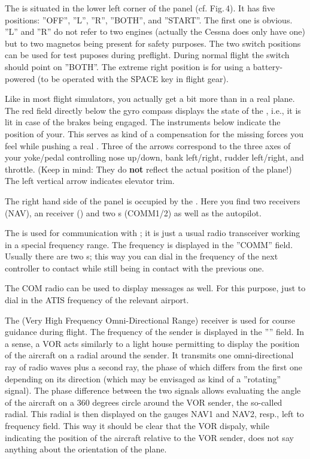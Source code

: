 The  is situated in the lower left corner of the panel (cf. Fig.\,4). It has five positions: ''OFF'', ''L'', ''R'', ''BOTH'', and ''START''. The first one is obvious. ''L'' and ''R'' do not refer to two engines (actually the Cessna does only have one) but to two magnetos being present for safety purposes. The two switch positions can be used for test puposes during preflight. During normal flight the switch should point on ''BOTH''. The extreme right position is for  using a battery-powered  (to be operated with the SPACE key in flight gear). 

Like in most flight simulators, you actually get a bit more than in a real plane. The red field directly below the gyro compass displays the state of the , i.e., it is lit in case of the brakes being engaged. The instruments below indicate the position of your. This serves as kind of a compensation for the missing forces you feel while pushing a real . Three of the arrows correspond to the three axes of your yoke/pedal controlling nose up/down, bank left/right, rudder left/right, and throttle. (Keep in mind: They do \textbf{not} reflect the actual position of the plane!) The left vertical arrow indicates elevator trim. 

The right hand side of the panel is occupied by the . Here you find
two  receivers (NAV), an  receiver
() and two s (COMM1/2) as
well as the autopilot.

The  is used for communication with ; it is just a usual radio transceiver working in a special frequency range.
The frequency is displayed in the ''COMM'' field. Usually there are two s; this way you can dial in the frequency of the next controller to contact
while still being in contact with the previous one.

The COM radio can be used to display  messages as well. For this purpose, just to dial in the ATIS frequency of the relevant airport.

The  (Very High Frequency Omni-Directional Range) receiver is used for course
guidance during flight. The frequency of the sender is displayed in the '''' field. In a sense, a VOR acts similarly to a light house permitting to display the position of the
aircraft on a radial around the sender. It transmits one omni-directional ray of radio
waves plus a second ray, the phase of which differs from the first one depending on its
direction (which may be envisaged as kind of a ''rotating'' signal). The phase difference between the two signals allows evaluating the angle of the aircraft on a 360 degrees circle
around the VOR sender, the so-called radial. This radial is then displayed on the gauges
NAV1 and NAV2, resp., left to frequency field. This way it should be clear that the VOR dispaly, while indicating the position of the aircraft relative to the VOR sender, does not say anything about the orientation of the plane. 

